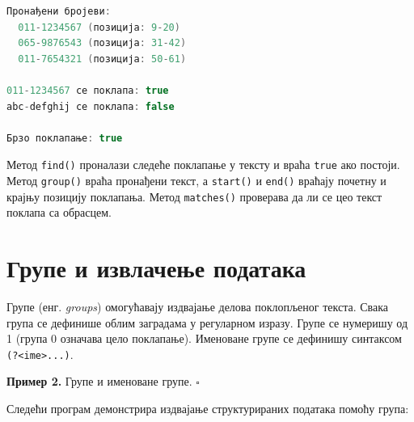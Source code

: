 \begin{lstlisting}[language=Java]
Пронађени бројеви:
  011-1234567 (позиција: 9-20)
  065-9876543 (позиција: 31-42)
  011-7654321 (позиција: 50-61)
 
011-1234567 се поклапа: true
abc-defghij се поклапа: false
 
Брзо поклапање: true
\end{lstlisting}


Метод \texttt{find()} проналази следеће поклапање у тексту и враћа \texttt{true} ако постоји. Метод \texttt{group()} враћа пронађени текст, а \texttt{start()} и \texttt{end()} враћају почетну и крајњу позицију поклапања. Метод \texttt{matches()} проверава да ли се цео текст поклапа са обрасцем.


\section{Групе и извлачење података}

Групе (енг. \textit{groups}) омогућавају издвајање делова поклопљеног текста. Свака група се дефинише облим заградама у регуларном изразу. Групе се нумеришу од 1 (група 0 означава цело поклапање). Именоване групе се дефинишу синтаксом \texttt{(?\textless{}ime\textgreater{}...)}.


\bigskip

\noindent \textbf{Пример 2.} Групе и именоване групе. $\square$

\medskip

Следећи програм демонстрира издвајање структурираних података помоћу група:


